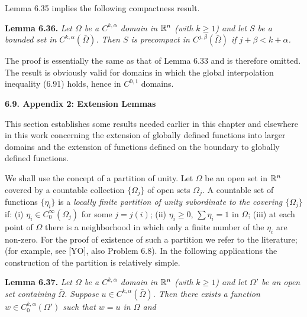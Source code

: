 \begin{flushleft}
Lemma 6.35 implies the following compactness result.
\end{flushleft}

\begin{flushleft}
\textbf{Lemma 6.36.} \emph{Let $\Omega$ be a $C^{k,\alpha}$ domain in $\mathbb{R}^n$ (with $k \ge 1$) and let $S$ be a bounded
set in $C^{k,\alpha}(\bar{\Omega})$. Then $S$ is precompact in $C^{j,\beta}(\bar{\Omega})$ if $j+\beta < k+\alpha$.}
\end{flushleft}

\begin{flushleft}
The proof is essentially the same as that of Lemma 6.33 and is therefore omitted.
The result is obviously valid for domains in which the global interpolation inequality (6.91) holds, hence in $C^{0,1}$ domains.
\end{flushleft}

\begin{flushleft}
\textbf{6.9. Appendix 2: Extension Lemmas}
\end{flushleft}

\begin{flushleft}
This section establishes some results needed earlier in this chapter and elsewhere
in this work concerning the extension of globally defined functions into larger
domains and the extension of functions defined on the boundary to globally
defined functions.
\end{flushleft}

\begin{flushleft}
We shall use the concept of a partition of unity. Let $\Omega$ be an open set in $\mathbb{R}^n$
covered by a countable collection $\{\Omega_j\}$ of open sets $\Omega_j$. A countable set of functions $\{\eta_i\}$ is a \emph{locally finite partition of unity subordinate to the covering $\{\Omega_j\}$} if:
(i) $\eta_i \in C_0^\infty(\Omega_j)$ for some $j=j(i)$; (ii) $\eta_i \ge 0$, $\sum \eta_i = 1$ in $\Omega$; (iii) at each point of $\Omega$
there is a neighborhood in which only a finite number of the $\eta_i$ are non-zero. For
the proof of existence of such a partition we refer to the literature; (for example,
see [YO], also Problem 6.8). In the following applications the construction of the
partition is relatively simple.
\end{flushleft}

\begin{flushleft}
\textbf{Lemma 6.37.} \emph{Let $\Omega$ be a $C^{k,\alpha}$ domain in $\mathbb{R}^n$ (with $k \ge 1$) and let $\Omega'$ be an open set
containing $\bar{\Omega}$. Suppose $u \in C^{k,\alpha}(\bar{\Omega})$. Then there exists a function $w \in C_0^{k,\alpha}(\Omega')$ such that
$w = u$ in $\Omega$ and}
\end{flushleft}

